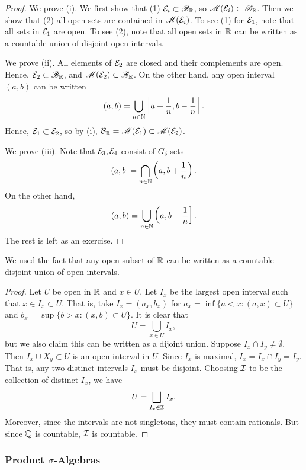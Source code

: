\documentclass[12pt]{article} %
\begin{document}
\begin{proof}
    We prove (i). We first show that (1) $\mathcal{E}_i \subset \mathscr{B}_{\mathbb{R}}$, so $\mathscr{M}(\mathcal{E}_i) \subset \mathscr{B}_{\mathbb{R}}$. Then we show that (2) all open sets are contained in $\mathscr{M}(\mathcal{E}_i)$. To see (1) for $\mathcal{E}_1$, note that all sets in $\mathcal{E}_1$ are open. To see (2), note that all open sets in $\mathbb{R}$ can be written as a countable union of disjoint open intervals.

    We prove (ii). All elements of $\mathcal{E}_2$ are closed and their complements are open. Hence, $\mathcal{E}_2 \subset \mathscr{B}_{\mathbb{R}}$, and $\mathscr{M}(\mathcal{E}_2) \subset \mathscr{B}_{\mathbb{R}}$. On the other hand, any open interval $(a, b)$ can be written \[(a, b) = \bigcup_{n \in \mathbb{N}} \left[a + \frac{1}{n}, b - \frac{1}{n}\right].\] Hence, $\mathcal{E}_1 \subset \mathcal{E}_2$, so by (i), $\mathcal{B}_{\mathbb{R}} = \mathscr{M}(\mathcal{E}_1) \subset \mathscr{M}(\mathcal{E}_2)$.

    We prove (iii). Note that $\mathcal{E}_3, \mathcal{E}_4$ consist of $G_\delta$ sets \[(a, b] = \bigcap_{n \in \mathbb{N}}\left(a, b + \frac{1}{n}\right).\] On the other hand, \[(a, b) = \bigcup_{n \in \mathbb{N}} \left(a, b - \frac{1}{n}\right].\]
    The rest is left as an exercise.
\end{proof}

\begin{remark}
    We used the fact that any open subset of $\mathbb{R}$ can be written as a countable disjoint union of open intervals. 
\end{remark}

\begin{proof}
    Let $U$ be open in $\mathbb{R}$ and $x \in U$. Let $I_x$ be the largest open interval such that $x \in I_x \subset U$. That is, take $I_x = (a_x, b_x)$ for $a_x = \inf\{a < x : (a, x) \subset U\}$ and $b_x = \sup \{ b > x : (x, b) \subset U\}$. It is clear that \[U = \bigcup_{x \in U} I_x,\] but we also claim this can be written as a dijoint union. Suppose $I_x \cap I_y \neq \emptyset$. Then $I_x \cup X_y \subset U$ is an open interval in $U$. Since $I_x$ is maximal, $I_x = I_x \cap I_y = I_y$. That is, any two distinct intervals $I_x$ must be disjoint. Choosing $\mathcal{I}$ to be the collection of distinct $I_x$, we have \[U = \bigsqcup_{I_x \in \mathcal{I}} I_x.\] Moreover, since the intervals are not singletons, they must contain rationals. But since $\mathbb{Q}$ is countable, $\mathcal{I}$ is countable.
\end{proof}

\subsubsection{Product $\sigma$-Algebras}
\end{document}
